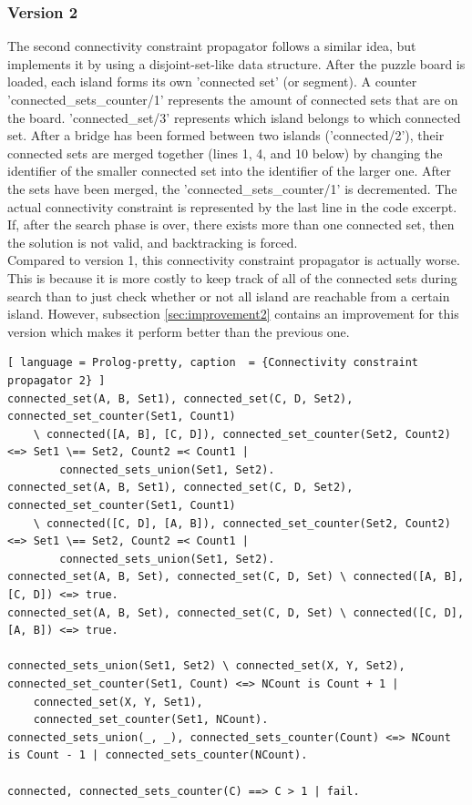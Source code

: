\documentclass{report}
\begin{document}
\subsubsection{Version 2}
The second connectivity constraint propagator follows a similar idea, but implements it by using a disjoint-set-like data structure. After the puzzle board is loaded, each island forms its own 'connected set' (or segment). A counter 'connected\_sets\_counter/1' represents the amount of connected sets that are on the board. 'connected\_set/3' represents which island belongs to which connected set. After a bridge has been formed between two islands ('connected/2'), their connected sets are merged together (lines 1, 4, and 10 below) by changing the identifier of the smaller connected set into the identifier of the larger one. After the sets have been merged, the 'connected\_sets\_counter/1' is decremented. The actual connectivity constraint is represented by the last line in the code excerpt. If, after the search phase is over, there exists more than one connected set, then the solution is not valid, and backtracking is forced. \\
Compared to version 1, this connectivity constraint propagator is actually worse. This is because it is more costly to keep track of all of the connected sets during search than to just check whether or not all island are reachable from a certain island. However, subsection \ref{sec:improvement2} contains an improvement for this version which makes it perform better than the previous one.

\begin{lstlisting}[ language = Prolog-pretty, caption  = {Connectivity constraint propagator 2} ]
connected_set(A, B, Set1), connected_set(C, D, Set2), connected_set_counter(Set1, Count1)
    \ connected([A, B], [C, D]), connected_set_counter(Set2, Count2)  <=> Set1 \== Set2, Count2 =< Count1 |
        connected_sets_union(Set1, Set2).
connected_set(A, B, Set1), connected_set(C, D, Set2), connected_set_counter(Set1, Count1)
    \ connected([C, D], [A, B]), connected_set_counter(Set2, Count2)  <=> Set1 \== Set2, Count2 =< Count1 |
        connected_sets_union(Set1, Set2).
connected_set(A, B, Set), connected_set(C, D, Set) \ connected([A, B], [C, D]) <=> true.
connected_set(A, B, Set), connected_set(C, D, Set) \ connected([C, D], [A, B]) <=> true.

connected_sets_union(Set1, Set2) \ connected_set(X, Y, Set2), connected_set_counter(Set1, Count) <=> NCount is Count + 1 |
    connected_set(X, Y, Set1),
    connected_set_counter(Set1, NCount).
connected_sets_union(_, _), connected_sets_counter(Count) <=> NCount is Count - 1 | connected_sets_counter(NCount).

connected, connected_sets_counter(C) ==> C > 1 | fail.
\end{lstlisting}
\end{document}
